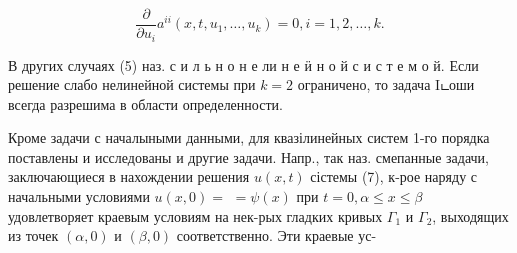 \documentclass[10pt]{article}
\begin{document}
\[

\frac{\partial}{\partial u_{i}} a^{i i}\left(x, t, u_{1}, \ldots, u_{k}\right)=0, i=1,2, \ldots, k .

\]



В других случаях (5) наз. с и л ь н о н е ли н е ӥ н о й с и с т е м о й. Если решение слабо нелинейной системы при $k=2$ ограничено, то задача Iடоши всегда разрешима в области определенности.



Кроме задачи с началыными данными, для квазілинейных систем 1-го порядка поставлены и исследованы и другие задачи. Напр., так наз. смепанные задачи, заключающиеся в нахождении решения $u(x, t)$ сістемы (7), к-рое наряду с начальными условиями $u(x, 0)=$ $=\psi(x)$ при $t=0, \alpha \leqslant x \leqslant \beta$ удовлетворяет краевым условиям на нек-рых гладких кривых $\Gamma_{1}$ и $\Gamma_{2}$, выходящих из точек $(\alpha, 0)$ и $(\beta, 0)$ соответственно. Эти краевые ус-
\end{document}
